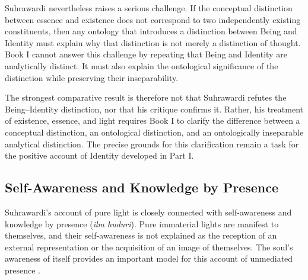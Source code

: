 \label{para:VS.B01.P01.C08.S14.SS11.P004}

Suhrawardi nevertheless raises a serious
challenge. If the conceptual distinction
between essence and existence does not
correspond to two independently
existing constituents, then any ontology
that introduces a distinction between
Being and Identity must explain why
that distinction is not merely a
distinction of thought. Book I cannot
answer this challenge by repeating
that Being and Identity are analytically
distinct. It must also explain the
ontological significance of the
distinction while preserving their
inseparability.

\label{para:VS.B01.P01.C08.S14.SS11.P005}

The strongest comparative result is therefore
not that Suhrawardi refutes the
Being--Identity distinction, nor that
his critique confirms it. Rather,
his treatment of existence, essence,
and light requires Book I to clarify
the difference between a conceptual
distinction, an ontological distinction,
and an ontologically inseparable
analytical distinction. The precise
grounds for this clarification remain
a task for the positive account of
Identity developed in Part I.


\subsection{Self-Awareness and Knowledge by Presence}
\label{sec:ch08-s14-ss12}

\label{para:VS.B01.P01.C08.S14.SS12.P001}

Suhrawardi's account of pure light is closely
connected with self-awareness and knowledge
by presence (\textit{ilm huduri}). Pure
immaterial lights are manifest to themselves,
and their self-awareness is not explained
as the reception of an external representation
or the acquisition of an image of themselves.
The soul's awareness of itself provides
an important model for this account of
unmediated presence \citep[Part II, §§114--117]{SuhrawardiPhilosophyIllumination,ZiaiKnowledgeIllumination1990}.

\label{para:VS.B01.P01.C08.S14.SS12.P002}

